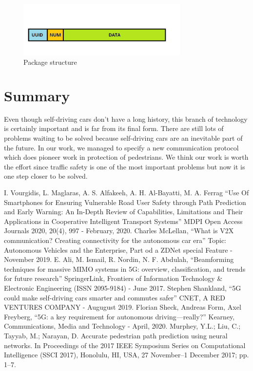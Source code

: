 \documentclass[conference]{IEEEtran}
\begin{document}
\begin{figure}[ht]
    \centering
    \includegraphics[width=8.5cm]{./pics/Package structure.png}
    \caption{Package structure}
\end{figure}

\section{Summary}
Even though self-driving cars don't have a long history, this branch of technology is certainly important and is far from its final form. There are still lots of problems waiting to be solved because self-driving cars are an inevitable part of the future. In our work, we managed to specify a new communication protocol which does pioneer work in protection of pedestrians. We think our work is worth the effort since traffic safety is one of the most important problems but now it is one step closer to be solved.

\begin{thebibliography}{00}
     I. Vourgidis, L. Maglaras, A. S. Alfakeeh, A. H. Al-Bayatti, M. A. Ferrag ``Use Of Smartphones for Ensuring Vulnerable Road User Safety through Path Prediction and Early Warning: An In-Depth Review of Capabilities, Limitations and Their Applications in Cooperative Intelligent Transport Systems'' MDPI Open Access Journals 2020, 20(4), 997 - February, 2020.
     Charles McLellan, ``What is V2X communication? Creating connectivity for the autonomous car era'' Topic: Autonomous Vehicles and the Enterprise, Part od a ZDNet special Feature - November 2019.
     E. Ali, M. Ismail, R. Nordin, N. F. Abdulah, ``Beamforming techniques for massive MIMO systems in 5G: overview, classification, and trends for future research'' SpringerLink, Frontiers of Information Technology \& Electronic Engineering  (ISSN 2095-9184) - June 2017.
     Stephen Shankland, ``5G could make self-driving cars smarter and commutes safer'' CNET, A RED VENTURES COMPANY - Augugust 2019.
     Florian Sheck, Andreas Form, Axel Freyberg, ``5G: a key requirement for autonomous driving—really?'' Kearney, Communications, Media and Technology - April, 2020.
     Murphey, Y.L.; Liu, C.; Tayyab, M.; Narayan, D. Accurate pedestrian path prediction using neural networks. In Proceedings of the 2017 IEEE Symposium Series on Computational Intelligence (SSCI 2017), Honolulu, HI, USA, 27 November–1 December 2017; pp. 1–7.
\end{thebibliography}
\vspace{12pt}
\end{document}
